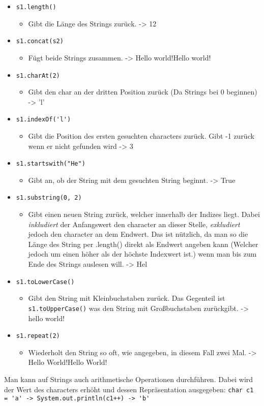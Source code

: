 \documentclass{article}
\begin{document}
	\begin{itemize}
		\item{\verb|s1.length()|}
		\begin{itemize}
			\item{Gibt die Länge des Strings zurück. -> 12}
		\end{itemize}
		\item{\verb|s1.concat(s2)|}
		\begin{itemize}
			\item{Fügt beide Strings zusammen. -> Hello world!Hello world!}
		\end{itemize}
		\item{\verb|s1.charAt(2)|}
		\begin{itemize}
			\item{Gibt den char an der dritten Position zurück (Da Strings bei 0 beginnen) -> 'l'}
		\end{itemize}
		\item{\verb|s1.indexOf('l')|}
		\begin{itemize}
			\item{Gibt die Position des ersten gesuchten characters zurück. Gibt -1 zurück wenn er nicht gefunden wird -> 3}
		\end{itemize}
		\item{\verb|s1.startswith("He")|}
		\begin{itemize}
			\item{Gibt an, ob der String mit dem gesuchten String beginnt. -> True}
		\end{itemize}
		\item{\verb|s1.substring(0, 2)|}
		\begin{itemize}
			\item{Gibt einen neuen String zurück, welcher innerhalb der Indizes liegt. Dabei \textit{inkludiert} der Anfangswert den character an dieser Stelle, \textit{exkludiert} jedoch den character an dem Endwert. Das ist nützlich, da man so die Länge des String per .length() direkt als Endwert angeben kann (Welcher jedoch um einen höher als der höchste Indexwert ist.) wenn man bis zum Ende des Strings auslesen will. -> Hel}
		\end{itemize}
		\item{\verb|s1.toLowerCase()|}
		\begin{itemize}
			\item{Gibt den String mit Kleinbuchstaben zurück. Das Gegenteil ist \verb|s1.toUpperCase()|  was den String mit Großbuchstaben zurückgibt. -> hello world!}
		\end{itemize}
		\item{\verb|s1.repeat(2)|}
		\begin{itemize}
			\item{Wiederholt den String so oft, wie angegeben, in diesem Fall zwei Mal. -> Hello World!Hello World!}
		\end{itemize}
	\end{itemize}
	Man kann auf Strings auch arithmetische Operationen durchführen. Dabei wird der Wert des characters erhöht und dessen Repräsentation ausgegeben: \verb|char c1 = 'a' -> System.out.println(c1++) -> 'b'|
\end{document}
